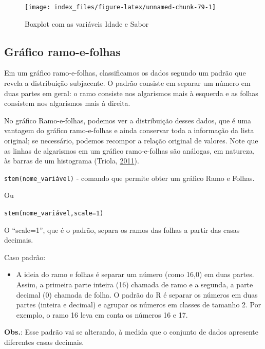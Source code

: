 \documentclass[12pt,brazil,oneside]{book}
\providecommand{\tightlist}{%
  \setlength{\itemsep}{0pt}\setlength{\parskip}{0pt}}
\begin{document}
\begin{figure}[H]

{\centering \texttt{[image: index\_files/figure-latex/unnamed-chunk-79-1]} 

}

\caption{Boxplot com as variáveis Idade e Sabor}\label{fig:unnamed-chunk-79}
\end{figure}

\hypertarget{grafico-ramo-e-folhas}{%
\subsection{Gráfico ramo-e-folhas}\label{grafico-ramo-e-folhas}}

Em um gráfico ramo-e-folhas, classificamos os dados segundo um padrão que revela a distribuição subjacente. O padrão consiste em separar um número em duas partes em geral: o ramo consiste nos algarismos mais à esquerda e as folhas consistem nos algarismos mais à direita.

No gráfico Ramo-e-folhas, podemos ver a distribuição desses dados, que é uma vantagem do gráfico ramo-e-folhas e ainda conservar toda a informação da lista original; se necessário, podemos recompor a relação original de valores. Note que as linhas de algarismos em um gráfico ramo-e-folhas são análogas, em natureza, às barras de um histograma (Triola, \protect\hyperlink{ref-triola1999}{2011}).

\texttt{stem(nome\_variável)} - comando que permite obter um gráfico Ramo e Folhas.

Ou

\texttt{stem(nome\_variável,scale=1)}

O ``scale=1'', que é o padrão, separa os ramos das folhas a partir das casas decimais.

Caso padrão:

\begin{itemize}
\tightlist
\item
  A ideia do ramo e folhas é separar um número (como 16,0) em duas partes. Assim, a primeira parte inteira (16) chamada de ramo e a segunda, a parte decimal (0) chamada de folha. O padrão do R é separar os números em duas partes (inteira e decimal) e agrupar os números em classes de tamanho 2. Por exemplo, o ramo 16 leva em conta os números 16 e 17.
\end{itemize}

\textbf{Obs.}: Esse padrão vai se alterando, à medida que o conjunto de dados apresente diferentes casas decimais.
\end{document}
